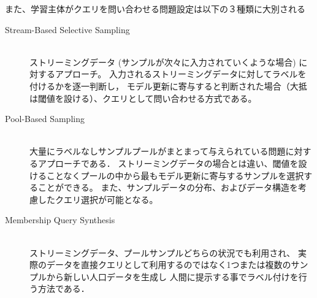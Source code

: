 また、学習主体がクエリを問い合わせる問題設定は以下の３種類に大別される
\begin{description}
    \item[Stream-Based Selective Sampling]\mbox{}\\
        ストリーミングデータ (サンプルが次々に入力されていくような場合) に対するアプローチ。
        入力されるストリーミングデータに対してラベルを付けるかを逐一判断し，
        モデル更新に寄与すると判断された場合（大抵は閾値を設ける）、クエリとして問い合わせる方式である。
    \item[Pool-Based Sampling]\mbox{}\\
        大量にラベルなしサンプルプールがまとまって与えられている問題に対するアプローチである．
        ストリーミングデータの場合とは違い、閾値を設けることなくプールの中から最もモデル更新に寄与するサンプルを選択することができる。
        また、サンプルデータの分布、およびデータ構造を考慮したクエリ選択が可能となる。
    \item[Membership Query Synthesis]\mbox{}\\ 
        ストリーミングデータ、プールサンプルどちらの状況でも利用され、
        実際のデータを直接クエリとして利用するのではなく1つまたは複数のサンプルから新しい人口データを生成し
        人間に提示する事でラベル付けを行う方法である．
\end{description}


